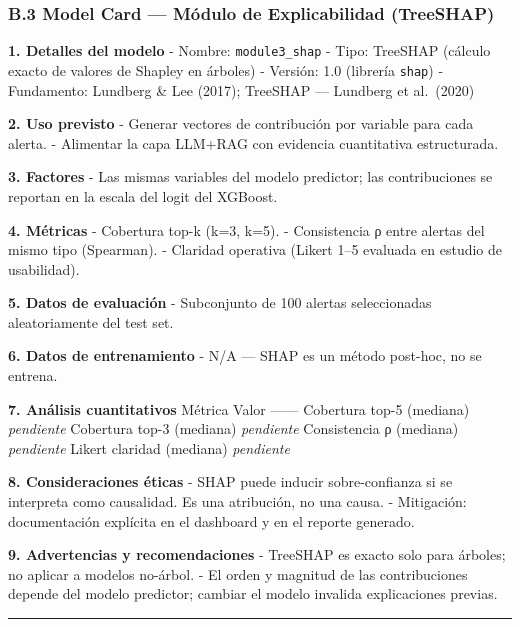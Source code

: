 \subsubsection{B.3 Model Card --- Módulo de Explicabilidad
(TreeSHAP)}\label{b.3-model-card-muxf3dulo-de-explicabilidad-treeshap}

\textbf{1. Detalles del modelo} - Nombre: \texttt{module3\_shap} - Tipo:
TreeSHAP (cálculo exacto de valores de Shapley en árboles) - Versión:
1.0 (librería \texttt{shap}) - Fundamento: Lundberg \& Lee (2017);
TreeSHAP --- Lundberg et al.~(2020)

\textbf{2. Uso previsto} - Generar vectores de contribución por variable
para cada alerta. - Alimentar la capa LLM+RAG con evidencia cuantitativa
estructurada.

\textbf{3. Factores} - Las mismas variables del modelo predictor; las
contribuciones se reportan en la escala del logit del XGBoost.

\textbf{4. Métricas} - Cobertura top-k (k=3, k=5). - Consistencia ρ
entre alertas del mismo tipo (Spearman). - Claridad operativa (Likert
1--5 evaluada en estudio de usabilidad).

\textbf{5. Datos de evaluación} - Subconjunto de 100 alertas
seleccionadas aleatoriamente del test set.

\textbf{6. Datos de entrenamiento} - N/A --- SHAP es un método post-hoc,
no se entrena.

\textbf{7. Análisis cuantitativos} \textbar{} Métrica \textbar{} Valor
\textbar{} \textbar---\textbar---\textbar{} \textbar{} Cobertura top-5
(mediana) \textbar{} \emph{pendiente} \textbar{} \textbar{} Cobertura
top-3 (mediana) \textbar{} \emph{pendiente} \textbar{} \textbar{}
Consistencia ρ (mediana) \textbar{} \emph{pendiente} \textbar{}
\textbar{} Likert claridad (mediana) \textbar{} \emph{pendiente}
\textbar{}

\textbf{8. Consideraciones éticas} - SHAP puede inducir sobre-confianza
si se interpreta como causalidad. Es una atribución, no una causa. -
Mitigación: documentación explícita en el dashboard y en el reporte
generado.

\textbf{9. Advertencias y recomendaciones} - TreeSHAP es exacto solo
para árboles; no aplicar a modelos no-árbol. - El orden y magnitud de
las contribuciones depende del modelo predictor; cambiar el modelo
invalida explicaciones previas.

\begin{center}\rule{0.5\linewidth}{0.5pt}\end{center}

